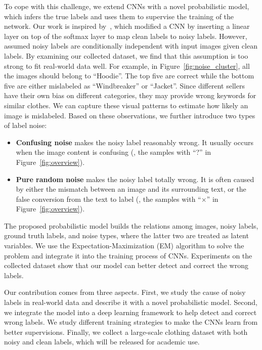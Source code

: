 \documentclass[10pt,twocolumn,letterpaper]{article}
\begin{document}
To cope with this challenge, we extend CNNs with a novel probabilistic model, which infers the true labels and uses them to supervise the training of the network. Our work is inspired by~\cite{sukhbaatar2014learning}, which modified a CNN by inserting a linear layer on top of the softmax layer to map clean labels to noisy labels. However,~\cite{sukhbaatar2014learning} assumed noisy labels are conditionally independent with input images given clean labels. By examining our collected dataset, we find that this assumption is too strong to fit real-world data well. For example, in Figure~\ref{fig:noise_cluster}, all the images should belong to ``Hoodie''. The top five are correct while the bottom five are either mislabeled as ``Windbreaker'' or ``Jacket''. Since different sellers have their own bias on different categories, they may provide wrong keywords for similar clothes. We can capture these visual patterns to estimate how likely an image is mislabeled. Based on these observations, we further introduce two types of label noise:
\begin{itemize}
\item \textbf{Confusing noise} makes the noisy label reasonably wrong. It usually occurs when the image content is confusing (\eg, the samples with ``?'' in Figure~\ref{fig:overview}).
\item \textbf{Pure random noise} makes the noisy label totally wrong. It is often caused by either the mismatch between an image and its surrounding text, or the false conversion from the text to label (\eg, the samples with ``$\times$'' in Figure~\ref{fig:overview}).
\end{itemize}

The proposed probabilistic model builds the relations among images, noisy labels, ground truth labels, and noise types, where the latter two are treated as latent variables. We use the Expectation-Maximization (EM) algorithm to solve the problem and integrate it into the training process of CNNs. Experiments on the collected dataset show that our model can better detect and correct the wrong labels.

Our contribution comes from three aspects. First, we study the cause of noisy labels in real-world data and describe it with a novel probabilistic model. Second, we integrate the model into a deep learning framework to help detect and correct wrong labels. We study different training strategies to make the CNNs learn from better supervisions. Finally, we collect a large-scale clothing dataset with both noisy and clean labels, which will be released for academic use.
\end{document}
